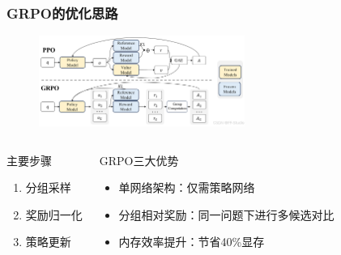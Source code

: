 \documentclass[10pt,aspectratio=169]{beamer}
\begin{document}
\begin{frame}
    \frametitle{GRPO的优化思路}
    \begin{figure}
        \includegraphics[width=0.6\textwidth]{GRPO/PPOvsGRPO.png}
    \end{figure}
    \begin{columns}[T]
        \begin{block}{主要步骤}
            \begin{enumerate}
                \item 分组采样
                \item 奖励归一化
                \item 策略更新
            \end{enumerate}
        \end{block}
        \begin{block}{GRPO三大优势}
            \begin{itemize}
                \item 单网络架构：仅需策略网络
                \item 分组相对奖励：同一问题下进行多候选对比
                \item 内存效率提升：节省40\%显存
            \end{itemize}
        \end{block}
    \end{columns} 
\end{frame}
\end{document}
